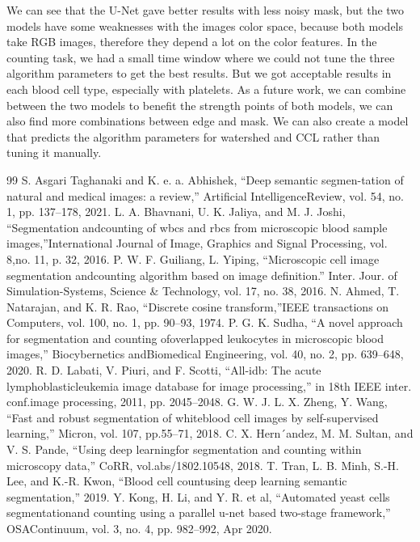 \documentclass[conference]{IEEEtran}
\begin{document}
We can see that the U-Net gave better results with less noisy mask, but the two models have some weaknesses with the images color space, because both models take RGB images, therefore they depend a lot on the color features.
In the counting task, we had a small time window where we could not tune the three algorithm parameters to get the best results. But we got acceptable results in each blood cell type, especially with platelets.
As a future work, we can combine between the two models to benefit the strength points of both models, we can also find more combinations between edge and mask. We can also create a model that predicts the algorithm parameters for watershed and CCL rather than tuning it manually.


\begin{thebibliography}{99}
 S. Asgari Taghanaki and K. e. a. Abhishek, “Deep semantic segmen-tation of natural and medical images: a review,” Artificial IntelligenceReview, vol. 54, no. 1, pp. 137–178, 2021.
 L. A. Bhavnani, U. K. Jaliya, and M. J. Joshi, “Segmentation andcounting of wbcs and rbcs from microscopic blood sample images,”International Journal of Image, Graphics and Signal Processing, vol. 8,no. 11, p. 32, 2016.
 P. W. F. Guiliang, L. Yiping, “Microscopic cell image segmentation andcounting algorithm based on image definition.” Inter. Jour. of Simulation-Systems, Science & Technology, vol. 17, no. 38, 2016.
 N. Ahmed, T. Natarajan, and K. R. Rao, “Discrete cosine transform,”IEEE transactions on Computers, vol. 100, no. 1, pp. 90–93, 1974.
 P. G. K. Sudha, “A novel approach for segmentation and counting ofoverlapped leukocytes in microscopic blood images,” Biocybernetics andBiomedical Engineering, vol. 40, no. 2, pp. 639–648, 2020.
 R. D. Labati, V. Piuri, and F. Scotti, “All-idb: The acute lymphoblasticleukemia image database for image processing,” in 18th IEEE inter. conf.image processing, 2011, pp. 2045–2048.
 G. W. J. L. X. Zheng, Y. Wang, “Fast and robust segmentation of whiteblood cell images by self-supervised learning,” Micron, vol. 107, pp.55–71, 2018.
 C. X. Hern´andez, M. M. Sultan, and V. S. Pande, “Using deep learningfor segmentation and counting within microscopy data,” CoRR, vol.abs/1802.10548, 2018.
 T. Tran, L. B. Minh, S.-H. Lee, and K.-R. Kwon, “Blood cell countusing deep learning semantic segmentation,” 2019.
 Y. Kong, H. Li, and Y. R. et al, “Automated yeast cells segmentationand counting using a parallel u-net based two-stage framework,” OSAContinuum, vol. 3, no. 4, pp. 982–992, Apr 2020.

\end{thebibliography}
\end{document}
